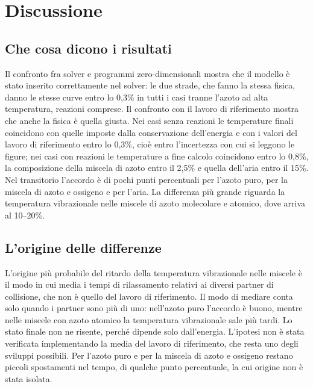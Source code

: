\section{Discussione}
\label{sec:discussione}

\subsection{Che cosa dicono i risultati}
\label{sec:discussione-risultati}

Il confronto fra solver e programmi zero-dimensionali mostra che il modello è
stato inserito correttamente nel solver: le due strade, che fanno la stessa
fisica, danno le stesse curve entro lo 0{,}3\% in tutti i casi
tranne l'azoto ad alta temperatura, reazioni comprese. Il confronto con il lavoro di riferimento mostra che
anche la fisica è quella giusta. Nei casi senza reazioni le temperature finali
coincidono con quelle imposte dalla conservazione dell'energia e con i valori
del lavoro di riferimento entro lo 0{,}3\%, cioè entro l'incertezza con cui si
leggono le figure; nei casi con reazioni le temperature a fine calcolo
coincidono entro lo 0{,}8\%, la composizione della miscela di azoto entro il
2{,}5\% e quella dell'aria entro il 15\%. Nel transitorio l'accordo
è di pochi punti percentuali per l'azoto puro, per la miscela di azoto e
ossigeno e per l'aria. La differenza più grande riguarda la temperatura
vibrazionale nelle miscele di azoto molecolare e atomico, dove arriva al
10--20\%.

\subsection{L'origine delle differenze}
\label{sec:discussione-origine}

L'origine più probabile del ritardo della temperatura vibrazionale nelle
miscele è il modo in cui \mpp{} media i tempi di rilassamento relativi ai
diversi partner di collisione, che non è quello del lavoro di riferimento. Il
modo di mediare conta solo quando i partner sono più di uno: nell'azoto puro
l'accordo è buono, mentre nelle miscele con azoto atomico la temperatura
vibrazionale sale più tardi. Lo stato finale non ne risente, perché dipende
solo dall'energia. L'ipotesi non è stata verificata implementando la media del
lavoro di riferimento, che resta uno degli sviluppi possibili. Per l'azoto puro
e per la miscela di azoto e ossigeno restano piccoli spostamenti nel tempo, di
qualche punto percentuale, la cui origine non è stata isolata.

